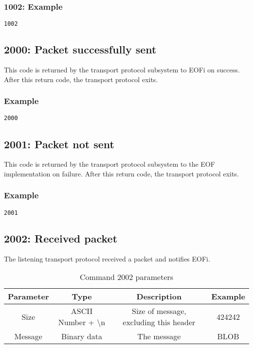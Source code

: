 \documentclass[12pt,a4paper]{book}
\begin{document}
\subsubsection{1002: Example}
\begin{verbatim}
1002
\end{verbatim}
\subsection{2000: Packet successfully sent}
This code is returned by the transport protocol subsystem to EOFi on success.
After this return code, the transport protocol exits.
\subsubsection{Example}
\begin{verbatim}
2000
\end{verbatim}
\subsection{2001: Packet not sent}
This code is returned by the transport protocol subsystem to the
EOF implementation on failure.
After this return code, the transport protocol exits.
\subsubsection{Example}
\begin{verbatim}
2001
\end{verbatim}
\subsection{2002: Received packet}
The listening transport protocol received a packet and notifies EOFi.
\begin{longtable}{|c|c|c|c|}
\caption{Command 2002 parameters}\\
\hline
\textbf{Parameter} & \textbf{Type} & \textbf{Description} & \textbf{Example}\\
\hline
Size & ASCII Number + \textbackslash{}n & Size of message, excluding this header & 424242\\
\hline
Message & Binary data & The message & BLOB\\
\hline
\end{longtable}
\end{document}
